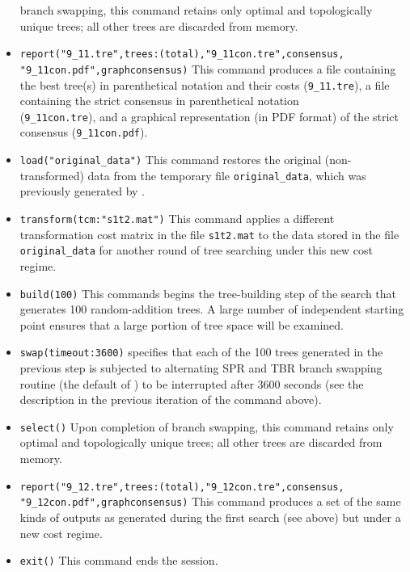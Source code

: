 \begin{itemize}
branch swapping, this command retains only optimal and topologically
unique trees; all other trees are discarded from memory.  
\item \texttt{report("9\_11.tre",trees:(total),"9\_11con.tre",consensus,\\
"9\_11con.pdf",graphconsensus)}
This command produces a file containing the best tree(s) in
parenthetical notation and their costs (\texttt{9\_11.tre}), a file
containing the strict consensus in parenthetical notation
\\(\texttt{9\_11con.tre}), and a graphical representation (in PDF
format) of the strict consensus (\texttt{9\_11con.pdf}).  
\item \texttt{load("original\_data")} This command restores the original
(non-trans\-formed) data from the temporary file \texttt{original\_data},
which was previously generated by .  
\item \texttt{transform(tcm:"s1t2.mat")} This command applies a different
transformation cost matrix in the file \texttt{s1t2.mat} to the
data stored in the file \texttt{original\_data} for another round
of tree searching under this new cost regime.  
\item \texttt{build(100)} This commands begins the tree-building step 
of the search that generates 100 random-addition trees. A large 
number of independent starting point ensures that a large portion 
of tree space will be examined.  
\item \texttt{swap(timeout:3600)}  specifies that each 
of the 100 trees generated in the previous step is subjected to 
alternating SPR and TBR branch swapping routine (the default of \poy) 
to be interrupted after 3600 seconds (see the description in the 
previous iteration of the command above).  
\item \texttt{select()} Upon completion of branch swapping,
this command retains only optimal and topologically unique trees;
all other trees are discarded from memory.  
\item \texttt{report("9\_12.tre",trees:(total),"9\_12con.tre",consensus,\\
"9\_12con.pdf",graphconsensus)}
This command produces a set of the same kinds of outputs as generated
during the first search (see above) but under a new cost regime.
\item \texttt{exit()} This command ends the \poy session.  
\end{itemize}



